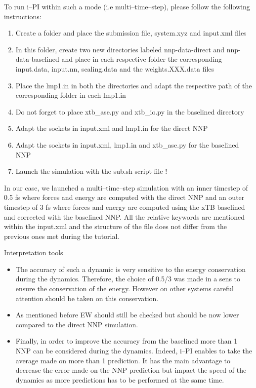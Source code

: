 \documentclass[12pt]{article}
\begin{document}
To run i--PI within such a mode (i.e multi--time--step), please follow the following instructions:
\begin{enumerate}
    \item Create a folder and place the submission file, system.xyz and input.xml files
    \item In this folder, create two new directories labeled nnp-data-direct and nnp-data-baselined and place in each respective folder the corresponding input.data, input.nn, scaling.data and the weights.XXX.data files
    \item Place the lmp1.in in both the directories and adapt the respective path of the corresponding folder in each lmp1.in
    \item Do not forget to place xtb\_ase.py and xtb\_io.py in the baselined directory
    \item Adapt the sockets in input.xml and lmp1.in for the direct NNP
    \item Adapt the sockets in input.xml, lmp1.in and xtb\_ase.py for the baselined NNP
    \item Launch the simulation with the sub.sh script file !
\end{enumerate}
In our case, we launched a multi--time--step simulation with an inner timestep of 0.5 fs where forces and energy are computed with the direct NNP and an outer timestep of 3 fs where forces and energy are computed using the xTB baselined and corrected with the baselined NNP. All the relative keywords are mentioned within the input.xml and the structure of the file does not differ from the previous ones met during the tutorial.
\begin{mybox1}{Interpretation tools}
\begin{itemize}
    \item The accuracy of such a dynamic is very sensitive to the energy conservation during the dynamics. Therefore, the choice of 0.5/3 was made in a sens to ensure the conservation of the energy. However on other systems careful attention should be taken on this conservation.
    \item As mentioned before EW should still be checked but should be now lower compared to the direct NNP simulation. 
    \item Finally, in order to improve the accuracy from the baselined more than 1 NNP can be considered during the dynamics. Indeed, i--PI enables to take the average made on more than 1 prediction. It has the main advantage to decrease the error made on the NNP prediction but impact the speed of the dynamics as more predictions has to be performed at the same time.
\end{itemize}
\end{mybox1}
%
%
\newpage
{}
\end{document}
